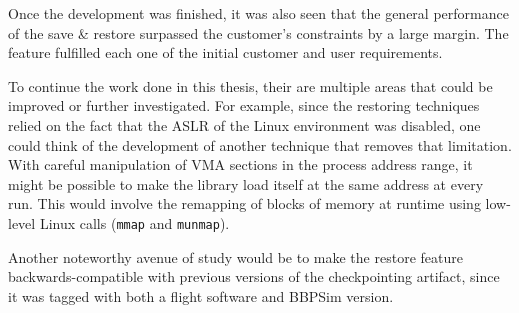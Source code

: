 Once the development was finished, it was also seen that the general performance of the save \& restore surpassed the customer's constraints by a large margin. The feature fulfilled each one of the initial customer and user requirements.

To continue the work done in this thesis, their are multiple areas that could be improved or further investigated. For example, since the restoring techniques relied on the fact that the \gls{ASLR} of the Linux environment was disabled, one could think of the development of another technique that removes that limitation. With careful manipulation of \gls{VMA} sections in the process address range, it might be possible to make the  library load itself at the same address at every run. This would involve the  remapping of blocks of memory at runtime using low-level Linux calls (\texttt{mmap} and \texttt{munmap}). 

Another noteworthy avenue of study would be to make the restore feature backwards-compatible with previous versions of the checkpointing artifact, since it was tagged with both a flight software and BBPSim version.